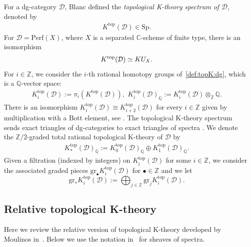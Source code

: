 \documentclass [11pt,oneside,a4paper,mathscr]{amsart}
\theoremstyle{definition}
\begin{document}
For a dg-category $\mathscr{D}$,
Blanc \cite{Blanc}
defined the
\textit{topological K-theory spectrum
	of $\mathscr{D}$}, denoted by
\begin{align}\label{def:topK:dg}K^{\mathrm{top}}(\mathscr{D}) \in \mathrm{Sp}.
\end{align}
For $\mathcal{D}=\mathrm{Perf}(X)$, where $X$ is a separated $\mathbb{C}$-scheme of finite type, 
there is an isomorphism 
\[K^{\rm{top}}(\mathcal{D}) \simeq KU_X.\]
For $i\in \mathbb{Z}$, we consider the $i$-th rational homotopy groups of~\eqref{def:topK:dg}, which is a $\mathbb{Q}$-vector space:
\begin{align*} 
K^{\mathrm{top}}_{i}(\mathscr{D}):=\pi_i(K^{\mathrm{top}}(\mathscr{D})),\,\,K^{\mathrm{top}}_i(\mathscr{D})_{\mathbb{Q}}:=K^{\mathrm{top}}_i(\mathscr{D})\otimes_\mathbb{Z}\mathbb{Q}.
\end{align*}
There is an isomorphism $K^{\mathrm{top}}_i(\mathscr{D})\cong K^{\mathrm{top}}_{i+2}(\mathscr{D})$ for every $i\in \mathbb{Z}$ given by multiplication with a Bott element, see \cite[Definition 1.6]{Blanc}.
The topological K-theory spectrum sends exact triangles of dg-categories to exact triangles of spectra \cite[Theorem 1.1(c)]{Blanc}.
We denote the $\mathbb{Z}/2$-graded total rational 
topological K-theory of $\mathscr{D}$ by
\begin{align*}K^{\mathrm{top}}_{\ast}(\mathscr{D})_{\mathbb{Q}}:=K^{\mathrm{top}}_0(\mathscr{D})_{\mathbb{Q}}\oplus K^{\mathrm{top}}_1(\mathscr{D})_{\mathbb{Q}}.
\end{align*}
Given a filtration (indexed by integers) on $K^{\mathrm{top}}_i(\mathscr{D})$ for some $i\in \mathbb{Z}$, we consider the associated graded pieces $\mathrm{gr}_\bullet K^{\mathrm{top}}_i(\mathscr{D})$ for $\bullet\in\mathbb{Z}$ and we let \[\mathrm{gr}_{\ast}K_i^{\mathrm{top}}(\mathscr{D}):=\bigoplus_{j\in \mathbb{Z}}\mathrm{gr}_j K_i^{\mathrm{top}}(\mathscr{D}).\]


\subsection{Relative topological K-theory}\label{subsec:reltopKth}
Here we review the relative version of topological
K-theory developed by Moulinos in~\cite{Moulinos}. 
Below we use the notation in~\cite[Section~2]{GS}
for sheaves of spectra. 
\end{document}
